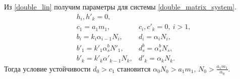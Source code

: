 Из \eqref{double_lin} получим параметры для системы \eqref{double_matrix_system}.
\begin{equation}
    \begin{split}
        & h_i, h'_k = 0, \\
        & c_1 = a_1 m_1, & c_i, c'_k = 0, ~ i>1,  \\
        & b_i = k_i \alpha_{i-1} N_{i}, & d_i = \alpha_i N_{i}, \\
        & b'_1 = k'_1 \alpha^b_s N'_1, & d^b_s = \alpha^b_s N_s, \\
        & b'_k = k'_k \alpha'_{k-1} N_{k}, & d'_k = \alpha_k N_{k}.
    \end{split}
\end{equation}
Тогда условие устойчивости \(d_0 > c_1\) становится \(\alpha_0 N_{0} > a_1 m_1\), \( N_0 > \frac{a_1 m_1}{\alpha_0}\).

